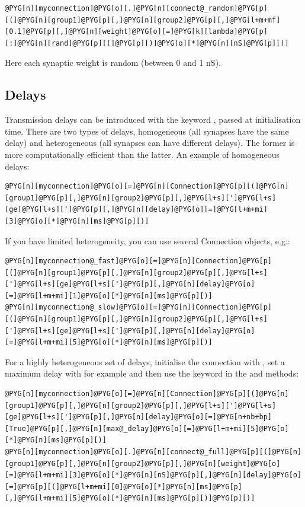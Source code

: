 \documentclass[letterpaper,10pt,english]{manual}
\begin{document}
\begin{Verbatim}[commandchars=@\[\]]
@PYG[n][myconnection]@PYG[o][.]@PYG[n][connect@_random]@PYG[p][(]@PYG[n][group1]@PYG[p][,]@PYG[n][group2]@PYG[p][,]@PYG[l+m+mf][0.1]@PYG[p][,]@PYG[n][weight]@PYG[o][=]@PYG[k][lambda]@PYG[p][:]@PYG[n][rand]@PYG[p][(]@PYG[p][)]@PYG[o][*]@PYG[n][nS]@PYG[p][)]
\end{Verbatim}

Here each synaptic weight is random (between 0 and 1 nS).


\subsection{Delays}

Transmission delays can be introduced with the keyword , passed at initialisation time.
There are two types of delays, homogeneous (all synapses have the same delay) and heterogeneous
(all synapses can have different delays). The former is more computationally efficient than the
latter. An example of homogeneous delays:

\begin{Verbatim}[commandchars=@\[\]]
@PYG[n][myconnection]@PYG[o][=]@PYG[n][Connection]@PYG[p][(]@PYG[n][group1]@PYG[p][,]@PYG[n][group2]@PYG[p][,]@PYG[l+s][']@PYG[l+s][ge]@PYG[l+s][']@PYG[p][,]@PYG[n][delay]@PYG[o][=]@PYG[l+m+mi][3]@PYG[o][*]@PYG[n][ms]@PYG[p][)]
\end{Verbatim}

If you have limited heterogeneity, you can use several Connection objects, e.g.:

\begin{Verbatim}[commandchars=@\[\]]
@PYG[n][myconnection@_fast]@PYG[o][=]@PYG[n][Connection]@PYG[p][(]@PYG[n][group1]@PYG[p][,]@PYG[n][group2]@PYG[p][,]@PYG[l+s][']@PYG[l+s][ge]@PYG[l+s][']@PYG[p][,]@PYG[n][delay]@PYG[o][=]@PYG[l+m+mi][1]@PYG[o][*]@PYG[n][ms]@PYG[p][)]
@PYG[n][myconnection@_slow]@PYG[o][=]@PYG[n][Connection]@PYG[p][(]@PYG[n][group1]@PYG[p][,]@PYG[n][group2]@PYG[p][,]@PYG[l+s][']@PYG[l+s][ge]@PYG[l+s][']@PYG[p][,]@PYG[n][delay]@PYG[o][=]@PYG[l+m+mi][5]@PYG[o][*]@PYG[n][ms]@PYG[p][)]
\end{Verbatim}

For a highly heterogeneous set of delays, initialise the connection with , set
a maximum delay with for example  and
then use the  keyword in the  and
 methods:

\begin{Verbatim}[commandchars=@\[\]]
@PYG[n][myconnection]@PYG[o][=]@PYG[n][Connection]@PYG[p][(]@PYG[n][group1]@PYG[p][,]@PYG[n][group2]@PYG[p][,]@PYG[l+s][']@PYG[l+s][ge]@PYG[l+s][']@PYG[p][,]@PYG[n][delay]@PYG[o][=]@PYG[n+nb+bp][True]@PYG[p][,]@PYG[n][max@_delay]@PYG[o][=]@PYG[l+m+mi][5]@PYG[o][*]@PYG[n][ms]@PYG[p][)]
@PYG[n][myconnection]@PYG[o][.]@PYG[n][connect@_full]@PYG[p][(]@PYG[n][group1]@PYG[p][,]@PYG[n][group2]@PYG[p][,]@PYG[n][weight]@PYG[o][=]@PYG[l+m+mi][3]@PYG[o][*]@PYG[n][nS]@PYG[p][,]@PYG[n][delay]@PYG[o][=]@PYG[p][(]@PYG[l+m+mi][0]@PYG[o][*]@PYG[n][ms]@PYG[p][,]@PYG[l+m+mi][5]@PYG[o][*]@PYG[n][ms]@PYG[p][)]@PYG[p][)]
\end{Verbatim}
\end{document}
